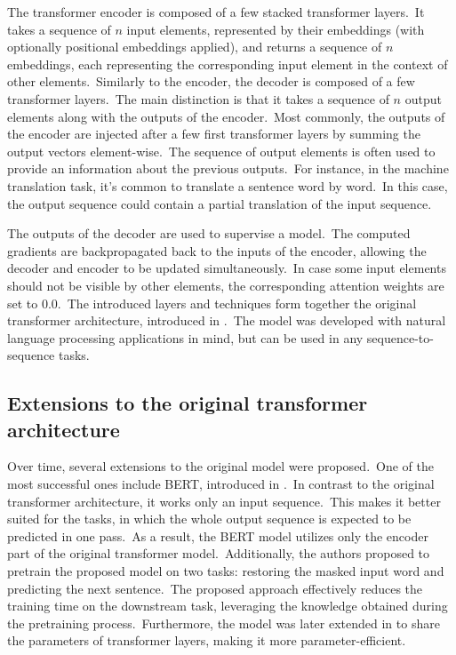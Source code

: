 \documentclass[longabstract, english, mgr]{iithesis}
\theoremstyle{default_theorem_style}\newtheorem{theorem}{Theorem}
\theoremstyle{default_theorem_style}\newtheorem{definition}{Definition}
\begin{document}
\noindent The transformer encoder is composed of a few stacked transformer layers.\ It takes a sequence of
$n$ input elements, represented by their embeddings (with optionally positional embeddings applied), and returns a
sequence of $n$ embeddings, each representing the corresponding input element in the context of other
elements.\ Similarly to the encoder, the decoder is composed of a few transformer layers.\ The main distinction is
that it takes a sequence of $n$ output elements along with the outputs of the encoder.\ Most commonly,
the outputs of the encoder are injected after a few first transformer layers by summing the output vectors
element-wise.\ The sequence of output elements is often used to provide an information about the previous
outputs.\ For instance, in the machine translation task, it's common to translate a sentence word by word.\ In this
case, the output sequence could contain a partial translation of the input sequence.\newline

\noindent The outputs of the decoder are used to supervise a model.\ The computed gradients are backpropagated
back to the inputs of the encoder, allowing the decoder and encoder to be updated simultaneously.\ In case some
input elements should not be visible by other elements, the corresponding attention weights are set to $0.0$.\ The
introduced layers and techniques form together the original transformer architecture, introduced in
\cite{transformer_model}.\ The model was developed with natural language processing applications in mind, but
can be used in any sequence-to-sequence tasks.

\subsection{Extensions to the original transformer architecture}

Over time, several extensions to the original model were proposed.\ One of the most successful ones include BERT,
introduced in \cite{bert_model}.\ In contrast to the original transformer architecture, it works only
an input sequence.\ This makes it better suited for the tasks, in which the whole output sequence is expected
to be predicted in one pass.\ As a result, the BERT model utilizes only the encoder part of the original transformer
model.\ Additionally, the authors proposed to pretrain the proposed model on two tasks: restoring the masked input
word and predicting the next sentence.\ The proposed approach effectively reduces the training time on the downstream
task, leveraging the knowledge obtained during the pretraining process.\ Furthermore, the model was later
extended in \cite{albert_model} to share the parameters of transformer layers, making it more
parameter-efficient.
\end{document}
